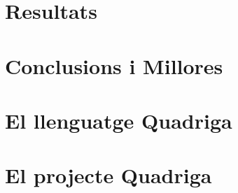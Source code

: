 \documentclass{book}
\begin{document}

\newpage

\newpage


\tableofcontents
\listoffigures





\chapter{Resultats}

\chapter{Conclusions i Millores}

% 



\appendix
\newpage
\chapter{El llenguatge Quadriga}
\chapter{El projecte Quadriga}
\end{document}
